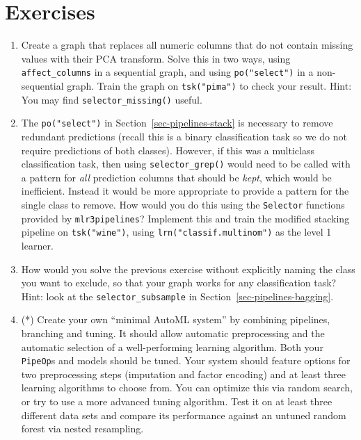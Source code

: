 \hypertarget{exercises-6}{%
\section{Exercises}\label{exercises-6}}

\begin{enumerate}
\def\labelenumi{\arabic{enumi}.}
\tightlist
\item
  Create a graph that replaces all numeric columns that do not contain
  missing values with their PCA transform. Solve this in two ways, using
  \texttt{affect\_columns} in a sequential graph, and using
  \texttt{po("select")} in a non-sequential graph. Train the graph on
  \texttt{tsk("pima")} to check your result. Hint: You may find
  \texttt{selector\_missing()} useful.
\item
  The \texttt{po("select")} in Section~\ref{sec-pipelines-stack} is
  necessary to remove redundant predictions (recall this is a binary
  classification task so we do not require predictions of both classes).
  However, if this was a multiclass classification task, then using
  \texttt{selector\_grep()} would need to be called with a pattern for
  \emph{all} prediction columns that should be \emph{kept}, which would
  be inefficient. Instead it would be more appropriate to provide a
  pattern for the single class to remove. How would you do this using
  the \texttt{Selector} functions provided by \texttt{mlr3pipelines}?
  Implement this and train the modified stacking pipeline on
  \texttt{tsk("wine")}, using \texttt{lrn("classif.multinom")} as the
  level 1 learner.
\item
  How would you solve the previous exercise without explicitly naming
  the class you want to exclude, so that your graph works for any
  classification task? Hint: look at the \texttt{selector\_subsample} in
  Section~\ref{sec-pipelines-bagging}.
\item
  (*) Create your own ``minimal AutoML system'' by combining pipelines,
  branching and tuning. It should allow automatic preprocessing and the
  automatic selection of a well-performing learning algorithm. Both your
  \texttt{PipeOp}s and models should be tuned. Your system should
  feature options for two preprocessing steps (imputation and factor
  encoding) and at least three learning algorithms to choose from. You
  can optimize this via random search, or try to use a more advanced
  tuning algorithm. Test it on at least three different data sets and
  compare its performance against an untuned random forest via nested
  resampling.
\end{enumerate}